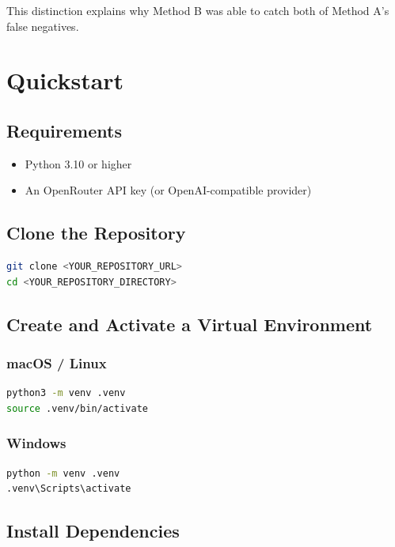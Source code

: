 \documentclass[11pt,a4paper]{article}
\begin{document}
This distinction explains why Method B was able to catch both of Method A's false negatives.


\section{Quickstart}

\subsection{Requirements}

\begin{itemize}
    \item Python 3.10 or higher
    \item An OpenRouter API key (or OpenAI-compatible provider)
\end{itemize}

\subsection{Clone the Repository}

\begin{lstlisting}[language=bash]
git clone <YOUR_REPOSITORY_URL>
cd <YOUR_REPOSITORY_DIRECTORY>
\end{lstlisting}

\subsection{Create and Activate a Virtual Environment}

\subsubsection{macOS / Linux}

\begin{lstlisting}[language=bash]
python3 -m venv .venv
source .venv/bin/activate
\end{lstlisting}

\subsubsection{Windows}

\begin{lstlisting}[language=bash]
python -m venv .venv
.venv\Scripts\activate
\end{lstlisting}

\subsection{Install Dependencies}
\end{document}
